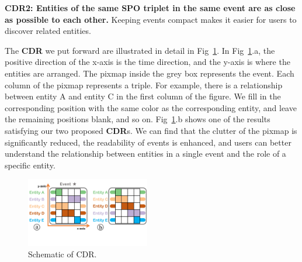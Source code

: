   \textbf{CDR2: Entities of the same SPO triplet in the same event are as close as possible to each other.} Keeping events compact makes it easier for users to discover related entities.

The \textbf{CDR} we put forward are illustrated in detail in Fig~\ref{fig:CDR}. In Fig~\ref{fig:CDR}.a, the positive direction of the x-axis is the time direction, and the y-axis is where the entities are arranged. The pixmap inside the grey box represents the event. Each column of the pixmap represents a triple. For example, there is a relationship between entity A and entity C in the first column of the figure. We fill in the corresponding position with the same color as the corresponding entity, and leave the remaining positions blank, and so on. Fig~\ref{fig:CDR}.b shows one of the results satisfying our two proposed \textbf{CDR}s. We can find that the clutter of the pixmap is significantly reduced, the readability of events is enhanced, and users can better understand the relationship between entities in a single event and the role of a specific entity.

\begin{figure}[h]
	\centering	
	\includegraphics[width=0.48\textwidth]{Fig/CDR.pdf}
	\vspace{-3.0em}
	\caption{Schematic of CDR.}
	\vspace{-1.5em}
	\label{fig:CDR}
\end{figure}